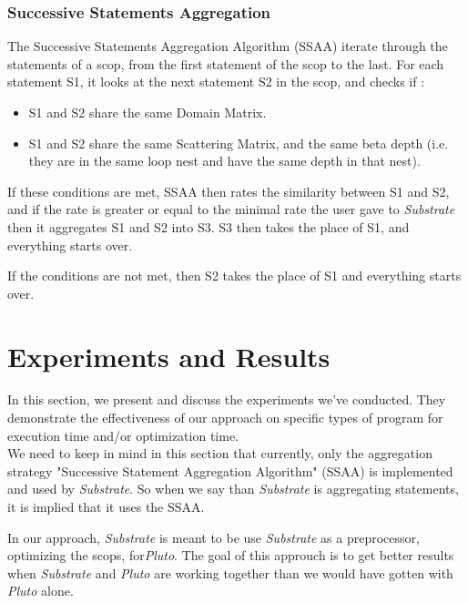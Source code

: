\documentclass[paper=a4, fontsize=11.5pt]{scrartcl}
\numberwithin{equation}{section}        %
\numberwithin{figure}{section}          %
\numberwithin{table}{section}               %
\begin{document}
        \subsubsection{Successive Statements Aggregation}
            The Successive Statements Aggregation Algorithm (SSAA) iterate through
            the statements of a scop, from the first statement of the scop to the last.
            For each statement S1, it looks at the next statement S2 in the scop, and
            checks if :
            \begin{itemize}
                \item S1 and S2 share the same Domain Matrix.
                \item S1 and S2 share the same Scattering Matrix, and the same beta depth
                    (i.e. they are in the same loop nest and have the same depth in that nest).
            \end{itemize}
            If these conditions are met, SSAA then rates the similarity between S1 and S2,
            and if the rate is greater or equal to the minimal rate the user gave to \textit{Substrate}
            then it aggregates S1 and S2 into S3. S3 then takes the place of S1, and everything starts
            over.

            If the conditions are not met, then S2 takes the place of S1 and everything starts over.
            

\section{Experiments and Results}
In this section, we present and discuss the experiments we've conducted.
They demonstrate the effectiveness of our approach on specific types of program for
execution time and/or optimization time.\\
We need to keep in mind in this section that currently, only the aggregation strategy 
"Successive Statement Aggregation Algorithm" (SSAA) is implemented and used by \textit{Substrate}.
So when we say than \textit{Substrate} is aggregating statements, it is implied that it uses
the SSAA.

\bigskip

In our approach, \textit{Substrate} is meant to be use \textit{Substrate} as a preprocessor,
optimizing the scops, for\textit{Pluto}.
The goal of this approuch is to get better results when \textit{Substrate} and \textit{Pluto}
are working together than we would have gotten with \textit{Pluto} alone.
\end{document}
